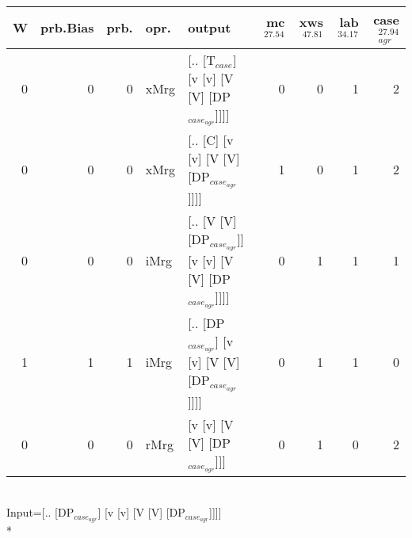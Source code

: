 \begin{tabularx}{\linewidth}{rrrlXrrrr}
\hline
   W &   prb.Bias &   prb. & opr.   & output                                                   &   mc$^{27.54}$ &   xws$^{47.81}$ &   lab$^{34.17}$ &   case$_{agr}^{27.94}$ \\
\hline
   0 &       0 &   0 & xMrg & [.. [T$_{case}$] [v [v] [V [V] [DP$_{case_{agr}}$]]]]              &            0 &             0 &             1 &                  2 \\
   0 &       0 &   0 & xMrg & [.. [C] [v [v] [V [V] [DP$_{case_{agr}}$]]]]                   &            1 &             0 &             1 &                  2 \\
   0 &       0 &   0 & iMrg & [.. [V [V] [DP$_{case_{agr}}$]] [v [v] [V [V] [DP$_{case_{agr}}$]]]] &            0 &             1 &             1 &                  1 \\
   1 &       1 &   1 & iMrg & [.. [DP$_{case_{agr}}$] [v [v] [V [V] [DP$_{case_{agr}}$]]]]         &            0 &             1 &             1 &                  0 \\
   0 &       0 &   0 & rMrg & [v [v] [V [V] [DP$_{case_{agr}}$]]]                            &            0 &             1 &             0 &                  2 \\
\hline
\end{tabularx}\endgroup\\
\begingroup\scriptsize Input=[.. [DP$_{case_{agr}}$] [v [v] [V [V] [DP$_{case_{agr}}$]]]]\\*
